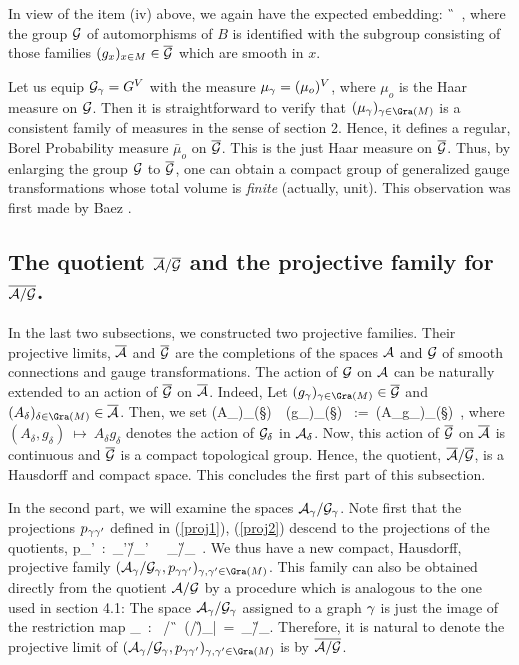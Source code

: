 In view of the item (iv) above, we again have the expected embedding:
\be
\G \ \rightarrow \Gb\ ,
\ee
where the group ${\cal G}$ of automorphisms of $B$ is identified with the
subgroup consisting of those families $(g_x)_{x\in M}\in{\overline {{\cal G}}}$ which are
smooth in $x$.

Let us equip ${\cal G}_\gamma = G^V$ with the measure $\mu_\gamma= (\mu_o)^V$, where
$\mu_o$ is the Haar measure on ${\cal G}$. Then it is straightforward to
verify that $(\mu_\g)_{\g\in\Gra(\S)}$ is a consistent family of
measures in the sense of section 2. Hence, it defines a regular, Borel
Probability measure $\bar{\mu}_o$ on ${\overline {{\cal G}}}$. This is the just Haar
measure on ${\overline {{\cal G}}}$. Thus, by enlarging the group ${\cal G}$ to ${\overline {{\cal G}}}$, one can
obtain a compact group of generalized gauge transformations whose
total volume is {\it finite} (actually, unit). This observation was
first made by Baez \cite{B2}.

\subsection{The quotient ${\overline {{\cal A}}}/{\overline {{\cal G}}}$ and the projective family for $\overline{{\cal A}/{\cal G}}$.}

In the last two subsections, we constructed two projective families.
Their projective limits, ${\overline {{\cal A}}}$ and ${\overline {{\cal G}}}$ are the completions of the
spaces ${\cal A}$ and ${\cal G}$ of smooth connections and gauge transformations.
The action of ${\cal G}$ on ${\cal A}$ can be naturally extended to an action of
${\overline {{\cal G}}}$ on ${\overline {{\cal A}}}$. Indeed, Let $(g_\g)_{\g\in\Gra(\S)}
\in \Gb$ and $(A_\delta)_{\delta\in\Gra(\S)}\in \Ab$. Then, we set
\be
(A_\delta)_{\delta\in\Gra(\S)}\ \ (g_\g)_{\g\in\Gra(\S)} \ :=\ 
(A_\delta g_\delta)_{\delta\in\Gra(\S)}\in\Ab\ ,
\ee
where $(A_\delta, g_\delta)\ \mapsto\ A_\delta g_\delta$ denotes the
action of ${\cal G}_\delta$ in ${\cal A}_\delta$. Now, this action of ${\overline {{\cal G}}}$ on
${\overline {{\cal A}}}$ is continuous and ${\overline {{\cal G}}}$ is a compact topological group. Hence,
the quotient, ${\overline {{\cal A}}}/{\overline {{\cal G}}}$, is a Hausdorff and compact space. This concludes
the first part of this subsection.

In the second part, we will examine the spaces ${\cal A}_{\gamma}/{\cal G}_{\gamma}$.
Note first that the projections $p_{\gamma\gamma'}$ defined in
(\ref{proj1}), (\ref{proj2}) descend to the projections of the
quotients,
\be \label{proj5}
p_{\g\g'}\ :\ \A_{\g'}/\G_{\g'} \ \rightarrow \ \A_{\g}/\G_{\g}\ .
\ee
We thus have a new compact, Hausdorff, projective family $(\A_\g/\G_\g,
p_{\g\g'})_ {\g,\g'\in\Gra(\S)}$. This family can also be obtained
directly from the quotient ${\cal A}/{\cal G}$ by a procedure which is analogous
to the one used in section 4.1: The space ${\cal A}_{\gamma}/{\cal G}_{\gamma}$ assigned
to a graph $\gamma$ is just the image of the restriction map
\be
\pi_\g \ : \ \A/\G\ \rightarrow \ (\A/\G)_{|\g}\ =\ \A_{\g}/\G_{\g}.
\ee
Therefore, it is natural to denote the projective limit of
$(\A_\g/\G_\g, p_{\g\g'})_{\g,\g'\in\Gra(\S)}$ is by
$\overline{{\cal A}/{\cal G}}$. 

